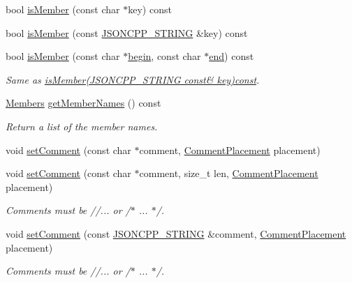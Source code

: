 \begin{DoxyCompactItemize}
bool \hyperlink{class_json_1_1_value_ad6d4df2227321bab05e86667609a7fad}{is\+Member} (const char $\ast$key) const
\item 
bool \hyperlink{class_json_1_1_value_a0c2cd838217b23ee6bde8135de1b30d9}{is\+Member} (const \hyperlink{config_8h_a1e723f95759de062585bc4a8fd3fa4be}{J\+S\+O\+N\+C\+P\+P\+\_\+\+S\+T\+R\+I\+NG} \&key) const
\item 
bool \hyperlink{class_json_1_1_value_a2007e1e51f21f44ecf1f13e4a1c567b9}{is\+Member} (const char $\ast$\hyperlink{class_json_1_1_value_a015459a3950c198d63a2d3be8f5ae296}{begin}, const char $\ast$\hyperlink{class_json_1_1_value_a3e443cd0ef24f7e028b175e47ee045e0}{end}) const
\begin{DoxyCompactList}\small\item\em Same as \hyperlink{class_json_1_1_value_a0c2cd838217b23ee6bde8135de1b30d9}{is\+Member(\+J\+S\+O\+N\+C\+P\+P\+\_\+\+S\+T\+R\+I\+N\+G const\& key)const}. \end{DoxyCompactList}\item 
\hyperlink{class_json_1_1_value_a9ae9069983fc38f1928d76f9c79ac64d}{Members} \hyperlink{class_json_1_1_value_a79d7725dce6260317333e69022367ac9}{get\+Member\+Names} () const
\begin{DoxyCompactList}\small\item\em Return a list of the member names. \end{DoxyCompactList}\item 
void \hyperlink{class_json_1_1_value_a29f3a30f7e5d3af6f38d57999bf5b480}{set\+Comment} (const char $\ast$comment, \hyperlink{namespace_json_a4fc417c23905b2ae9e2c47d197a45351}{Comment\+Placement} placement)
\item 
void \hyperlink{class_json_1_1_value_a2900152a2887b410a9ddabe278b9d492}{set\+Comment} (const char $\ast$comment, size\+\_\+t len, \hyperlink{namespace_json_a4fc417c23905b2ae9e2c47d197a45351}{Comment\+Placement} placement)
\begin{DoxyCompactList}\small\item\em Comments must be //... or /$\ast$ ... $\ast$/. \end{DoxyCompactList}\item 
void \hyperlink{class_json_1_1_value_a2c5d13a5f45eb77e912008778e65b27f}{set\+Comment} (const \hyperlink{config_8h_a1e723f95759de062585bc4a8fd3fa4be}{J\+S\+O\+N\+C\+P\+P\+\_\+\+S\+T\+R\+I\+NG} \&comment, \hyperlink{namespace_json_a4fc417c23905b2ae9e2c47d197a45351}{Comment\+Placement} placement)
\begin{DoxyCompactList}\small\item\em Comments must be //... or /$\ast$ ... $\ast$/. \end{DoxyCompactList}\item 

\end{DoxyCompactItemize}
